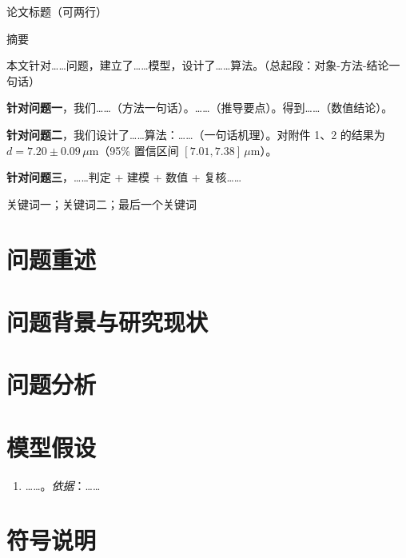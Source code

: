 \documentclass[11pt,a4paper,fontset=fandol]{ctexart}
\newcommand{\um}{\,\mu\mathrm{m}}
\begin{document}
\begin{center}
    {\heiti 论文标题（可两行）}
\end{center}

\begin{center}
    {\heiti 摘\quad 要}
\end{center}

本文针对……问题，建立了……模型，设计了……算法。（总起段：对象-方法-结论一句话）

\textbf{针对问题一}，我们……（方法一句话）。……（推导要点）。得到……（数值结论）。

\textbf{针对问题二}，我们设计了……算法：……（一句话机理）。对附件 1、2 的结果为
$d=7.20\pm0.09\um$（95\% 置信区间 $[7.01,7.38]\um$）。

\textbf{针对问题三}，……判定 + 建模 + 数值 + 复核……

\vspace{0.6em}
关键词一；关键词二；\mbox{最后一个关键词}  %

\newpage

\section{问题重述}

\section{问题背景与研究现状}

\section{问题分析}

\section{模型假设}
\begin{enumerate}[label=\textbf{假设\arabic*：}, leftmargin=3.6em]
    \item ……。\emph{依据}：…… %
\end{enumerate}

\section{符号说明}
\end{document}
